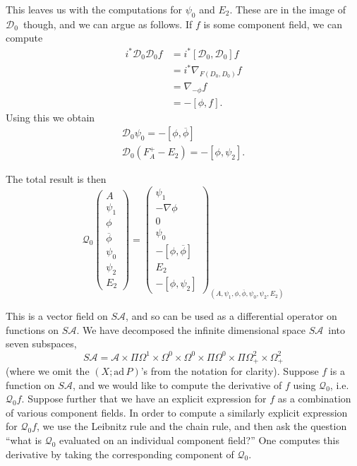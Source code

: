 \documentclass[twoside]{amsart}
\newcommand{\enm}[1]{\ensuremath{#1}}
\renewcommand{\aa}{\enm{\mathcal{A}}}
\newcommand{\sa}{\enm{S\aa}}
\renewcommand{\bar}[1]{\overline{#1}}
\newcommand{\ad}{\enm{\mathrm{ad}}}
\newcommand{\nab}{\enm{\nabla}}
\newcommand{\dzc}{\enm{\mathcal{D}_{0}}}
\newcommand{\qzc}{\enm{\mathcal{Q}_{0}}}
\newcommand{\adp}{\enm{\ad\,P}}
\begin{document}
This leaves us with the computations for \( \psi_{0} \) and \(
E_{2} \).  These are in the image of \dzc\ though, and we
can argue as follows.  If \( f \) is some component field, we can
compute
\begin{align}
    i^{*}\dzc\dzc f &= i^{*}[\dzc,\dzc]f \\
                    &= i^{*}\nab_{F(D_{0},D_{0})}f \\
                    &= \nab_{-\phi}f \\
                    &= -[\phi,f].
\end{align}
Using this we obtain
\begin{gather}
    \boxed{\dzc \psi_{0} = -[\phi,\bar{\phi}]} \\
    \boxed{\dzc (F_{A}^{+}-E_{2}) = -[\phi,\psi_{2}].}
\end{gather}

The total result is then
\begin{equation}
    \label{eq:q0onfields}
    \boxed{
    \qzc\left(
    \begin{array}{c}
        A \\
        \psi_{1} \\
        \phi \\
        \bar{\phi} \\
        \psi_{0} \\
        \psi_{2} \\
        E_{2}
    \end{array}
    \right)
     =
     \left(
     \begin{array}{c}
         \psi_{1} \\
         -\nab\phi \\
         0 \\
         \psi_{0} \\
         -\left[\phi,\bar{\phi}\right] \\
         E_{2} \\
         -\left[\phi, \psi_{2}\right]
     \end{array}
     \right)_{(A, \psi_{1}, \phi, \bar{\phi}, \psi_{0}, \psi_{2},
E_{2})}
    }
\end{equation}

This is a vector field on \sa, and so can be used as a differential
operator on functions on \sa.  We have
decomposed the infinite dimensional space \sa\ into seven subspaces,
\begin{equation}
    \label{eq:structureofsa}
    \sa = \aa \times\Pi \Omega^{1} \times \Omega^{0} \times \Omega^{0}
    \times \Pi \Omega^{0} \times \Pi \Omega^{2}_{+} \times
    \Omega^{2}_{+}
\end{equation}
(where we omit the \( (X; \adp) \)'s from the notation for clarity).
Suppose \( f \) is a function on \sa, and we would like to compute the
derivative of \( f \) using \( \qzc \), i.e. \( \qzc f
\).
Suppose further that we have an explicit expression for \( f \) as a
combination of various component fields.  In order to compute a
similarly explicit expression for \( \qzc f \), we use the Leibnitz
rule and the chain rule, and then ask the question ``what is \( \qzc
\)
evaluated on an individual component field?''  One computes this
derivative by taking the corresponding component of \( \qzc \).
\end{document}

